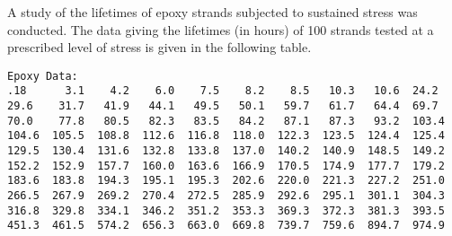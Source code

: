 \documentclass{article}\usepackage{graphicx, color}
\def\vn{\vskip0mm}
\begin{document}
A study of the lifetimes of epoxy strands subjected to sustained stress was conducted.
The data giving the lifetimes (in hours) of 100 strands tested at a prescribed level of stress is given in the following table.
\vn
\small
\begin{verbatim}
Epoxy Data:
.18      3.1    4.2    6.0    7.5    8.2    8.5   10.3   10.6  24.2
29.6    31.7   41.9   44.1   49.5   50.1   59.7   61.7   64.4  69.7
70.0    77.8   80.5   82.3   83.5   84.2   87.1   87.3   93.2  103.4
104.6  105.5  108.8  112.6  116.8  118.0  122.3  123.5  124.4  125.4
129.5  130.4  131.6  132.8  133.8  137.0  140.2  140.9  148.5  149.2
152.2  152.9  157.7  160.0  163.6  166.9  170.5  174.9  177.7  179.2
183.6  183.8  194.3  195.1  195.3  202.6  220.0  221.3  227.2  251.0
266.5  267.9  269.2  270.4  272.5  285.9  292.6  295.1  301.1  304.3
316.8  329.8  334.1  346.2  351.2  353.3  369.3  372.3  381.3  393.5
451.3  461.5  574.2  656.3  663.0  669.8  739.7  759.6  894.7  974.9
\end{verbatim}
\normalsize
\end{document}
